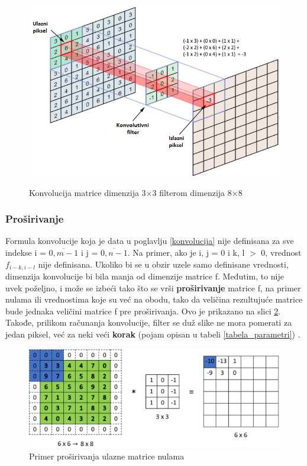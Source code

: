 \documentclass[a4paper]{article}
\begin{document}
\begin{figure}[h!]
\caption{Konvolucija matrice dimenzija 3$\times$3 filterom dimenzija 8$\times$8}
\centering
\includegraphics[scale=0.9]{convolution.png}
\label{fig:convolution}
\end{figure}

\subsubsection{Proširivanje}
\label{prosirivanje}

Formula konvolucije koja je data u poglavlju \ref{konvolucija} nije definisana za sve indekse i = $\overline{0, m-1}$ i j = $\overline{0, n-1}$. Na primer, ako je i, j = 0 i k, l $>$ 0, vrednost $f_{i-k, i-l}$ nije definisana. Ukoliko bi se u obzir uzele samo definisane vrednosti, dimenzija konvolucije bi bila manja od dimenzije matrice f. Međutim, to nije uvek poželjno, i može se izbeći tako što se vrši \textbf{proširivanje} matrice f, na primer nulama ili vrednostima koje su već na obodu, tako da veličina rezultujuće matrice bude jednaka veličini matrice f pre proširivanja. Ovo je prikazano na slici \ref{fig:padding}. Takođe, prilikom računanja konvolucije, filter se duž slike ne mora pomerati za jedan piksel, već za neki veći \textbf{korak} (pojam opisan u tabeli \ref{tabela_parametri}) \cite{MLskripta}.

\begin{figure}[h!]
\begin{center}
\includegraphics[scale=0.38]{padding.png}
\end{center}
\caption{Primer proširivanja ulazne matrice nulama}
\label{fig:padding}
\end{figure}
\end{document}
